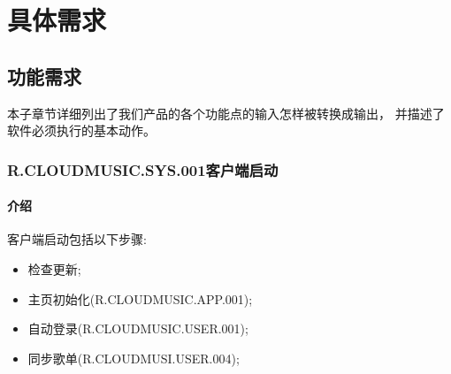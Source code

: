 
\chapter{具体需求}

\section{功能需求}

本子章节详细列出了我们产品的各个功能点的输入怎样被转换成输出，
	并描述了软件必须执行的基本动作。

\subsection{R.CLOUDMUSIC.SYS.001客户端启动}
\subsubsection{介绍}
客户端启动包括以下步骤:
	\begin{itemize}
		\item 检查更新;
		\item 主页初始化(R.CLOUDMUSIC.APP.001);
		\item 自动登录(R.CLOUDMUSIC.USER.001);
		\item 同步歌单(R.CLOUDMUSI.USER.004);
	\end{itemize}

